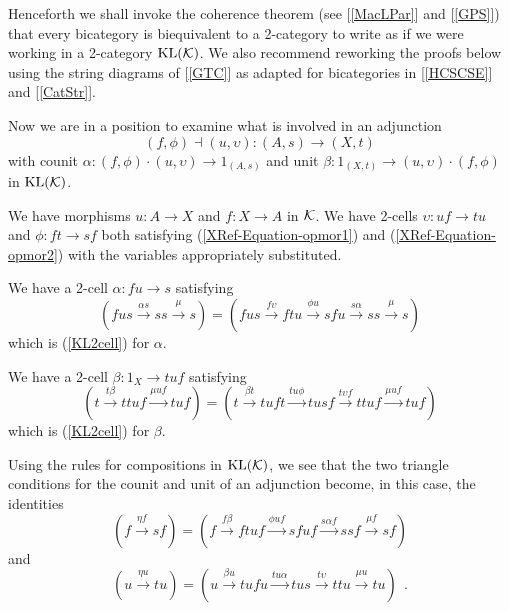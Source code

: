 \documentclass[a4paper,10pt]{article}
\newcommand{\bk}{{\cal{K}}}
\numberwithin{equation}{section}
\begin{document}
Henceforth we shall invoke the coherence theorem (see [\ref{MacLPar}] and [\ref{GPS}]) that every bicategory is biequivalent to a 2-category to write as if we were working in a 2-category
$\mathrm{KL}(\bk)$. We also recommend reworking the proofs below using the string diagrams of [\ref{GTC}] as adapted for bicategories in [\ref{HCSCSE}] and [\ref{CatStr}].

Now we are in a position to examine what is involved in an adjunction
\begin{equation}\label{AdjKL}
\left( f,\phi \right) \dashv \left( u,\upsilon \right) :\left( A,s\right)
\longrightarrow \left( X,t\right) 
\end{equation}
with counit $\alpha: (f,\phi)\cdot(u,\upsilon)\longrightarrow 1_{(A,s)}$ 
and unit $\beta: 1_{(X,t)} \longrightarrow (u,\upsilon)\cdot(f,\phi)$ in $\mathrm{KL}(\bk)$. 

We have morphisms $u:A \longrightarrow X$ and $f:X \longrightarrow A$ in $\bk$.
We have 2-cells $\upsilon : uf \longrightarrow tu$ 
and $\phi : ft \longrightarrow sf$ both satisfying (\ref{XRef-Equation-opmor1}) 
and (\ref{XRef-Equation-opmor2}) with the variables appropriately substituted.

We have a 2-cell $\alpha: fu \longrightarrow s$ satisfying
\begin{equation}\label{alpha}
\left( f u s\overset{\alpha  s}{\longrightarrow }s s\overset{\mu
}{\longrightarrow }s\right) =\left( f u s \overset{f \upsilon }{\longrightarrow
}f t u\overset{\phi  u}{\longrightarrow }s f u\overset{s \alpha
}{\longrightarrow }s s\overset{\mu }{\longrightarrow }s\right) 
\end{equation} 
which is (\ref{KL2cell}) for $\alpha$. 

We have a 2-cell $\beta : 1_X \longrightarrow tuf$ satisfying
\begin{equation}\label{beta}
\left( t\overset{t \beta }{\longrightarrow }t t u f\overset{\mu
u f}{\longrightarrow }t u f\right) =\left( t \overset{\beta  t}{\longrightarrow
}t u f t\overset{t u \phi }{\longrightarrow }t u s f\overset{t \upsilon
f}{\longrightarrow }t t u f\overset{\mu  u f}{\longrightarrow }t
u f\right) 
\end{equation}
which is (\ref{KL2cell}) for $\beta$. 

Using the rules for compositions in $\mathrm{KL}(\bk)$, 
we see that the two triangle conditions for the counit and unit of 
an adjunction become, in this case, the identities
\begin{equation}\label{triangle1}
\left( f\overset{\eta  f}{\longrightarrow }s f\right) =\left( f
\overset{f \beta }{\longrightarrow} ftuf \overset{\phi  u f}{\longrightarrow
}s f u f\overset{s \alpha  f}{\longrightarrow }s s f\overset{\mu
f}{\longrightarrow }s f\right) 
\end{equation}
and
\begin{equation}\label{triangle2}
\left( u\overset{\eta  u}{\longrightarrow }t u\right) =\left( u
\overset{\beta  u}{\longrightarrow }t u f u\overset{t u \alpha }{\longrightarrow
}t u s\overset{t \upsilon }{\longrightarrow }t t u\overset{\mu 
u}{\longrightarrow }t u\right) \ \ .
\end{equation}
\end{document}
